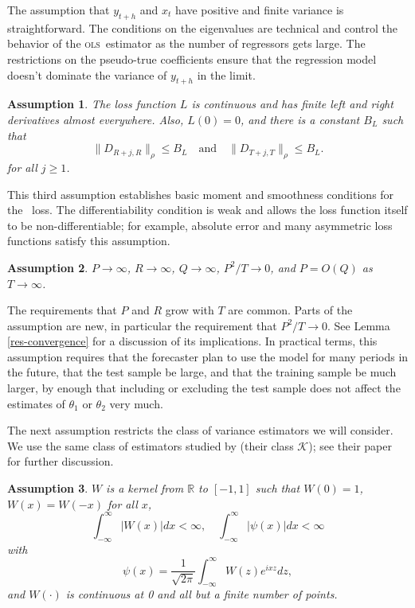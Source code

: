 \documentclass[11pt]{article}
\newtheorem{asmp}{Assumption}
\newcommand{\h}{h}
\newcommand{\ols}{\textsc{ols}}
\renewcommand{\Re}{\ensuremath{\mathbb{R}}}
\begin{document}
The assumption that $y_{t+\h}$ and $x_t$ have positive and finite
variance is straightforward.  The conditions on the eigenvalues are
technical and control the behavior of the \ols\ estimator as the
number of regressors gets large.  The restrictions on the pseudo-true
coefficients ensure that the regression model doesn't dominate the
variance of $y_{t+\h}$ in the limit.  

\begin{asmp}\label{asmp-3}
  The loss function $L$ is continuous and has finite left and right
  derivatives almost everywhere.  Also, $L(0) = 0$, and there is a
  constant $B_L$ such that
  \begin{equation*}
    \|D_{R+j,R}\|_\rho \leq B_L \quad\text{and}\quad
    \|D_{T+j,T}\|_\rho \leq B_L.
  \end{equation*}
  for all $j \geq 1$.
\end{asmp}

This third assumption establishes basic moment and smoothness
conditions for the \oos\ loss.  The differentiability
condition is weak and allows the loss function itself to be
non-differentiable; for example, absolute error and many asymmetric loss functions
satisfy this assumption.

\begin{asmp} \label{asmp-4} $P\to\infty$,
  $R\to\infty$, $Q\to\infty$, $P^2/T \to 0$, and $P = O(Q)$ as $T \to \infty$.
\end{asmp}

The requirements that $P$ and $R$ grow with $T$ are common.  Parts of
the assumption are new, in particular the requirement that $P^2/T \to
0$.  See Lemma \ref{res-convergence} for a discussion of its
implications.  In practical terms, this assumption requires that the
forecaster plan to use the model for many periods in the future, that
the test sample be large, and that the training sample be much larger,
by enough that including or excluding the test sample does not affect
the estimates of $\theta_1$ or $\theta_2$ very much.

The next assumption restricts the class of variance estimators we will
consider.  We use the same class of estimators studied by
\citet{DeD:00} (their class $\mathcal{K}$); see
their paper for further discussion.

\begin{asmp}
  \label{asmp-5} $W$ is a kernel from 
$\Re$ to $[-1,1]$ such that $W(0) = 1$, $W(x) = W(-x)$ for all $x$,
\begin{equation*}
    \int_{-\infty}^{\infty} \lvert W(x) \rvert dx < \infty, \quad
    \int_{-\infty}^{\infty} \lvert \psi(x) \rvert dx < \infty
\end{equation*}
with
\begin{equation*} \psi(x) = \frac1{\sqrt{2\pi}} \int_{-\infty}^{\infty} W(z) e^{ixz}dz,
\end{equation*}
and $W(\cdot)$ is continuous at 0 and all but a finite number of
points.
\end{asmp}
\end{document}
